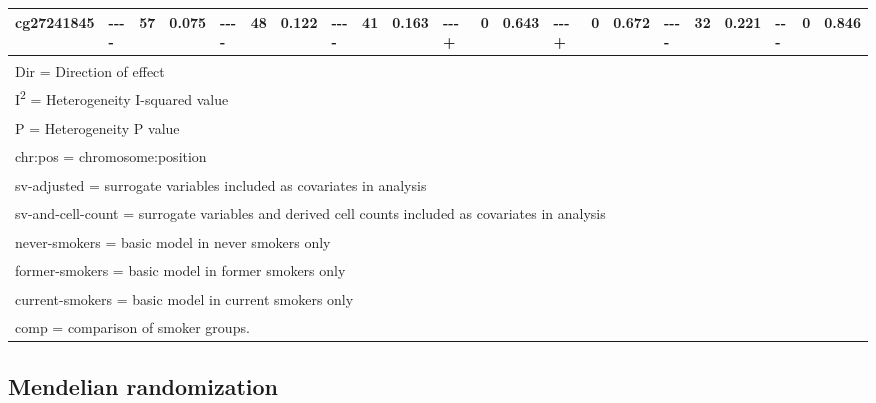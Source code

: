 \documentclass[11pt,oneside]{bristolthesis}
\begin{document}
\begin{landscape}
\begin{table}[!h]
{\begin{tabular}[t]{llllllllllllllllllllll}
\addlinespace
cg27241845 & {-}{-}{-}{-} & 57 & 0.075 & {-}{-}{-}{-} & 48 & 0.122 & {-}{-}{-}{-} & 41 & 0.163 & {-}{-}{-}{+} & 0 & 0.643 & {-}{-}{-}{+} & 0 & 0.672 & {-}{-}{-}{-} & 32 & 0.221 & {-}{-}{-} & 0 & 0.846\\
\bottomrule
\multicolumn{22}{l}{\textsuperscript{} Dir = Direction of effect}\\
\multicolumn{22}{l}{\textsuperscript{} I\textsuperscript{2} = Heterogeneity I-squared value}\\
\multicolumn{22}{l}{\textsuperscript{} P = Heterogeneity P value}\\
\multicolumn{22}{l}{\textsuperscript{} chr:pos = chromosome:position}\\
\multicolumn{22}{l}{\textsuperscript{} sv-adjusted = surrogate variables included as covariates in analysis}\\
\multicolumn{22}{l}{\textsuperscript{} sv-and-cell-count = surrogate variables and derived cell counts included as covariates in analysis}\\
\multicolumn{22}{l}{\textsuperscript{} never-smokers = basic model in never smokers only}\\
\multicolumn{22}{l}{\textsuperscript{} former-smokers = basic model in former smokers only}\\
\multicolumn{22}{l}{\textsuperscript{} current-smokers = basic model in current smokers only}\\
\multicolumn{22}{l}{\textsuperscript{} comp = comparison of smoker groups.}\\
\end{tabular}}
\end{table}
\end{landscape}
\hypertarget{results-mendelian-randomization-07}{%
\subsection{Mendelian randomization}\label{results-mendelian-randomization-07}}
\end{document}
